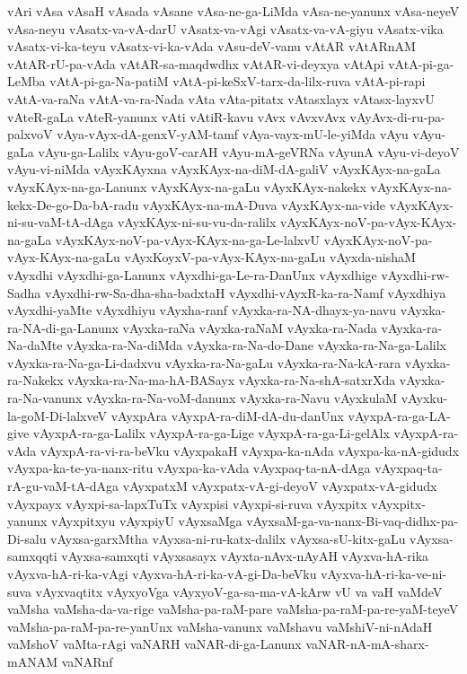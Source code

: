 {vAri
vAsa
vAsaH
vAsada
vAsane
vAsa-ne-ga-LiMda
vAsa-ne-yanunx
vAsa-neyeV
vAsa-neyu
vAsatx-va-vA-darU
vAsatx-va-vAgi
vAsatx-va-vA-giyu
vAsatx-vika
vAsatx-vi-ka-teyu
vAsatx-vi-ka-vAda
vAsu-deV-vanu
vAtAR
vAtARnAM
vAtAR-rU-pa-vAda
vAtAR-sa-maqdwdhx
vAtAR-vi-deyxya
vAtApi
vAtA-pi-ga-LeMba
vAtA-pi-ga-Na-patiM
vAtA-pi-keSxV-tarx-da-lilx-ruva
vAtA-pi-rapi
vAtA-va-raNa
vAtA-va-ra-Nada
vAta
vAta-pitatx
vAtasxlayx
vAtasx-layxvU
vAteR-gaLa
vAteR-yanunx
vAti
vAtiR-kavu
vAvx
vAvxvAvx
vAyAvx-di-ru-pa-palxvoV
vAya-vAyx-dA-genxV-yAM-tamf
vAya-vayx-mU-le-yiMda
vAyu
vAyu-gaLa
vAyu-ga-Lalilx
vAyu-goV-carAH
vAyu-mA-geVRNa
vAyunA
vAyu-vi-deyoV
vAyu-vi-niMda
vAyxKAyxna
vAyxKAyx-na-diM-dA-galiV
vAyxKAyx-na-gaLa
vAyxKAyx-na-ga-Lanunx
vAyxKAyx-na-gaLu
vAyxKAyx-nakekx
vAyxKAyx-na-kekx-De-go-Da-bA-radu
vAyxKAyx-na-mA-Duva
vAyxKAyx-na-vide
vAyxKAyx-ni-su-vaM-tA-dAga
vAyxKAyx-ni-su-vu-da-ralilx
vAyxKAyx-noV-pa-vAyx-KAyx-na-gaLa
vAyxKAyx-noV-pa-vAyx-KAyx-na-ga-Le-lalxvU
vAyxKAyx-noV-pa-vAyx-KAyx-na-gaLu
vAyxKoyxV-pa-vAyx-KAyx-na-gaLu
vAyxda-nishaM
vAyxdhi
vAyxdhi-ga-Lanunx
vAyxdhi-ga-Le-ra-DanUnx
vAyxdhige
vAyxdhi-rw-Sadha
vAyxdhi-rw-Sa-dha-sha-badxtaH
vAyxdhi-vAyxR-ka-ra-Namf
vAyxdhiya
vAyxdhi-yaMte
vAyxdhiyu
vAyxha-ranf
vAyxka-ra-NA-dhayx-ya-navu
vAyxka-ra-NA-di-ga-Lanunx
vAyxka-raNa
vAyxka-raNaM
vAyxka-ra-Nada
vAyxka-ra-Na-daMte
vAyxka-ra-Na-diMda
vAyxka-ra-Na-do-Dane
vAyxka-ra-Na-ga-Lalilx
vAyxka-ra-Na-ga-Li-dadxvu
vAyxka-ra-Na-gaLu
vAyxka-ra-Na-kA-rara
vAyxka-ra-Nakekx
vAyxka-ra-Na-ma-hA-BASayx
vAyxka-ra-Na-shA-satxrXda
vAyxka-ra-Na-vanunx
vAyxka-ra-Na-voM-danunx
vAyxka-ra-Navu
vAyxkulaM
vAyxku-la-goM-Di-lalxveV
vAyxpAra
vAyxpA-ra-diM-dA-du-danUnx
vAyxpA-ra-ga-LA-give
vAyxpA-ra-ga-Lalilx
vAyxpA-ra-ga-Lige
vAyxpA-ra-ga-Li-gelAlx
vAyxpA-ra-vAda
vAyxpA-ra-vi-ra-beVku
vAyxpakaH
vAyxpa-ka-nAda
vAyxpa-ka-nA-gidudx
vAyxpa-ka-te-ya-nanx-ritu
vAyxpa-ka-vAda
vAyxpaq-ta-nA-dAga
vAyxpaq-ta-rA-gu-vaM-tA-dAga
vAyxpatxM
vAyxpatx-vA-gi-deyoV
vAyxpatx-vA-gidudx
vAyxpayx
vAyxpi-sa-lapxTuTx
vAyxpisi
vAyxpi-si-ruva
vAyxpitx
vAyxpitx-yanunx
vAyxpitxyu
vAyxpiyU
vAyxsaMga
vAyxsaM-ga-va-nanx-Bi-vaq-didhx-pa-Di-salu
vAyxsa-garxMtha
vAyxsa-ni-ru-katx-dalilx
vAyxsa-sU-kitx-gaLu
vAyxsa-samxqqti
vAyxsa-samxqti
vAyxsasayx
vAyxta-nAvx-nAyAH
vAyxva-hA-rika
vAyxva-hA-ri-ka-vAgi
vAyxva-hA-ri-ka-vA-gi-Da-beVku
vAyxva-hA-ri-ka-ve-ni-suva
vAyxvaqtitx
vAyxyoVga
vAyxyoV-ga-sa-ma-vA-kArw
vU
va
vaH
vaMdeV
vaMsha
vaMsha-da-va-rige
vaMsha-pa-raM-pare
vaMsha-pa-raM-pa-re-yaM-teyeV
vaMsha-pa-raM-pa-re-yanUnx
vaMsha-vanunx
vaMshavu
vaMshiV-ni-nAdaH
vaMshoV
vaMta-rAgi
vaNARH
vaNAR-di-ga-Lanunx
vaNAR-nA-mA-sharx-mANAM
vaNARnf
}
